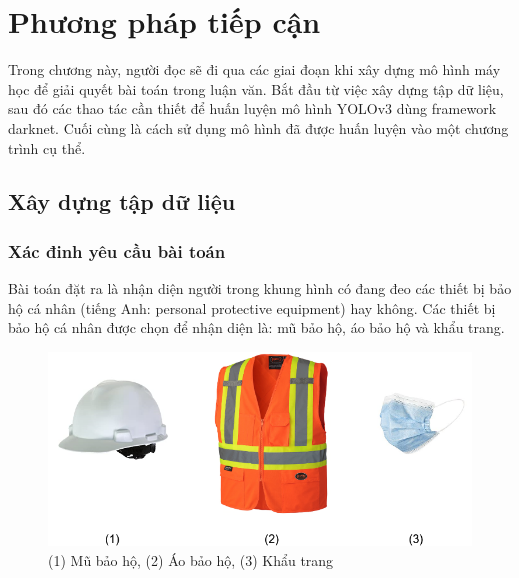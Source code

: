 \chapter{Phương pháp tiếp cận}
Trong chương này, người đọc sẽ đi qua các giai đoạn khi xây dựng mô hình máy học để giải quyết bài toán trong luận văn. Bắt đầu từ việc xây dựng tập dữ liệu, sau đó các thao tác cần thiết để huấn luyện mô hình YOLOv3 dùng framework darknet. Cuối cùng là cách sử dụng mô hình đã được huấn luyện vào một chương trình cụ thể.
\section{Xây dựng tập dữ liệu}
\subsection{Xác đinh yêu cầu bài toán}
Bài toán đặt ra là nhận diện người trong khung hình có đang đeo các thiết bị bảo hộ cá nhân (tiếng Anh: personal protective equipment) hay không. Các thiết bị bảo hộ cá nhân được chọn để nhận diện là: mũ bảo hộ, áo bảo hộ và khẩu trang.
\begin{figure}[ht!]
	\centerline{\includegraphics[scale=0.3]{images/ppe.png}}
  	\caption{(1) Mũ bảo hộ, (2) Áo bảo hộ, (3) Khẩu trang}
  	\label{fig:ppe}
\end{figure}

